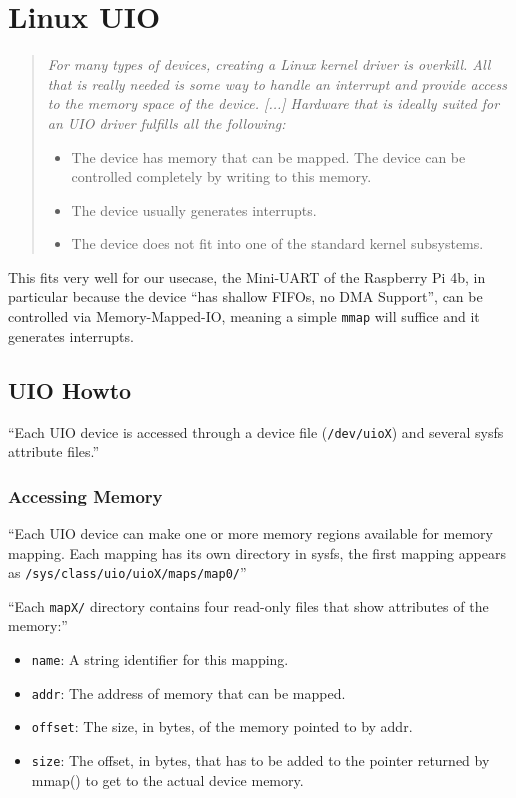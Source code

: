 \documentclass[../main.tex]{subfiles}
\begin{document}
    \clearpage

    \section{Linux UIO}
    \begin{quote}
        \it
        For many types of devices, creating a Linux kernel driver is overkill. All that is really needed is some way to handle an interrupt and provide access to the memory space of the device. [...] Hardware that is ideally suited for an UIO driver fulfills all the following:

        \begin{itemize}
            \item The device has memory that can be mapped. The device can be controlled completely by writing to this memory.
            \item The device usually generates interrupts.
            \item The device does not fit into one of the standard kernel subsystems.
        \end{itemize}
    \end{quote}

    This fits very well for our usecase, the Mini-UART of the Raspberry Pi 4b, in particular because the device \enquote{has shallow FIFOs, no DMA Support}, can be controlled via Memory-Mapped-IO, meaning a simple \texttt{mmap} will suffice and it generates interrupts.


    \subsection{UIO Howto}

    \enquote{Each UIO device is accessed through a device file (\texttt{/dev/uioX}) and several sysfs attribute files.} 
    
    \subsubsection{Accessing Memory}
    \enquote{Each UIO device can make one or more memory regions available for memory mapping. Each mapping has its own directory in sysfs, the first mapping appears as \texttt{/sys/class/uio/uioX/maps/map0/}}

    \enquote{Each \texttt{mapX/} directory contains four read-only files that show attributes of the memory:}
    \begin{itemize}
        \item \texttt{name}: A string identifier for this mapping.
        \item \texttt{addr}: The address of memory that can be mapped.
        \item \texttt{offset}: The size, in bytes, of the memory pointed to by addr.
        \item \texttt{size}: The offset, in bytes, that has to be added to the pointer returned by mmap() to get to the actual device memory.
    \end{itemize}
\end{document}
